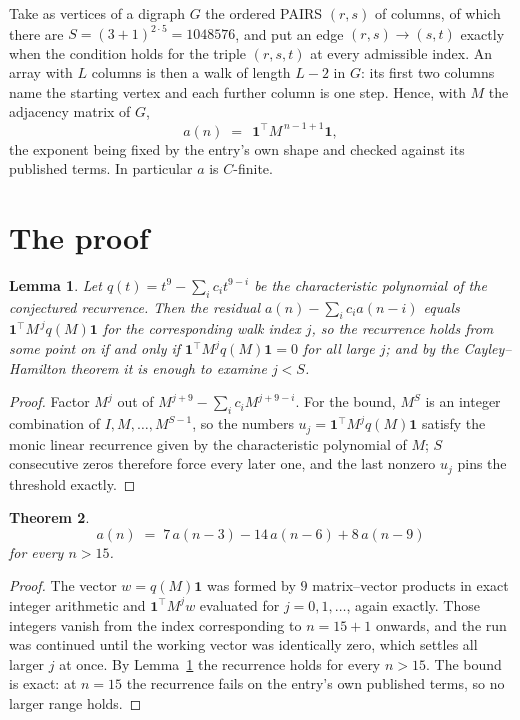 \documentclass[11pt,a4paper]{article}
\theoremstyle{plain}
\newtheorem{theorem}{Theorem}
\newtheorem{lemma}[theorem]{Lemma}
\theoremstyle{definition}
\begin{document}
Take as vertices of a digraph $G$ the ordered PAIRS $(r,s)$ of columns, of which there are
$S=(3+1)^{2\cdot5}=1048576$, and put an edge $(r,s)\to(s,t)$ exactly when the condition
holds for the triple $(r,s,t)$ at every admissible index. An array with $L$ columns is then a
walk of length $L-2$ in $G$: its first two columns name the starting vertex and each further
column is one step. Hence, with $M$ the adjacency matrix of $G$,
\[
a(n)\;=\;\,\mathbf{1}^{\!\top}M^{\,n-1+1}\mathbf{1},
\]
the exponent being fixed by the entry's own shape and checked against its published terms.
In particular $a$ is $C$-finite.

\section{The proof}

\begin{lemma}\label{lem:crit}
Let $q(t)=t^{9}-\sum_i c_it^{9-i}$ be the characteristic polynomial of the
conjectured recurrence. Then the residual $a(n)-\sum_ic_ia(n-i)$ equals
$\mathbf{1}^{\!\top}M^{\,j}q(M)\mathbf{1}$ for the corresponding walk index
$j$, so the recurrence holds from some point on if and only if
$\mathbf{1}^{\!\top}M^{j}q(M)\mathbf{1}=0$ for all large $j$; and by the
Cayley--Hamilton theorem it is enough to examine $j<S$.
\end{lemma}

\begin{proof}
Factor $M^{j}$ out of $M^{j+9}-\sum_ic_iM^{j+9-i}$. For the bound, $M^{S}$
is an integer combination of $I,M,\dots,M^{S-1}$, so the numbers
$u_j=\mathbf{1}^{\!\top}M^{j}q(M)\mathbf{1}$ satisfy the monic linear recurrence given by
the characteristic polynomial of $M$; $S$ consecutive zeros therefore force every later one,
and the last nonzero $u_j$ pins the threshold exactly.
\end{proof}

\begin{theorem}
\[
a(n)\;=\;7\,a(n-3) - 14\,a(n-6) + 8\,a(n-9)
\]
for every $n>15$.
\end{theorem}

\begin{proof}
The vector $w=q(M)\mathbf{1}$ was formed by $9$ matrix--vector products in exact
integer arithmetic and $\mathbf{1}^{\!\top}M^{j}w$ evaluated for $j=0,1,\dots$, again
exactly. Those integers vanish from the index corresponding to $n=15+1$ onwards, and the
run was continued until the working vector was identically zero, which settles all larger $j$
at once. By Lemma~\ref{lem:crit} the recurrence holds for every $n>15$. The bound is exact: at $n=15$ the recurrence fails on the entry's own published terms, so no larger range holds.
\end{proof}
\end{document}
